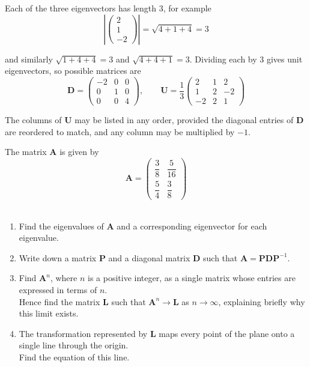 \documentclass[leqno]{article}
\begin{document}
\begin{enumerate}[
  label=\textbf{\arabic*.},
  leftmargin=*,
  topsep=0pt,
  partopsep=0pt,
  parsep=0pt
]
\begin{djsSolution}
\begin{enumerate}[label=\textbf{(\alph*)}, start=1]
Each of the three eigenvectors has length 3, for example
\[
\left|\begin{pmatrix}2\\1\\-2\end{pmatrix}\right|=\sqrt{4+1+4}=3
\]

and similarly \(\sqrt{1+4+4}=3\) and \(\sqrt{4+4+1}=3\). Dividing each by 3 gives unit eigenvectors, so possible matrices are
\[
\mathbf{D}=\begin{pmatrix} -2 & 0 & 0 \\ 0 & 1 & 0 \\ 0 & 0 & 4 \end{pmatrix},\qquad
\mathbf{U}=\dfrac{1}{3}\begin{pmatrix} 2 & 1 & 2 \\ 1 & 2 & -2 \\ -2 & 2 & 1 \end{pmatrix}
\]

The columns of \(\mathbf{U}\) may be listed in any order, provided the diagonal entries of \(\mathbf{D}\) are reordered to match, and any column may be multiplied by \(-1\).
\end{enumerate}
\end{djsSolution}

\newpage

\questionitem

The matrix $\mathbf{A}$ is given by
\[\mathbf{A} = \begin{pmatrix} \dfrac{3}{8} & \dfrac{5}{16} \\[6pt] \dfrac{5}{4} & \dfrac{3}{8} \end{pmatrix}\] \\
\begin{enumerate}[label=\textbf{(\alph*)}]
  \item Find the eigenvalues of $\mathbf{A}$ and a corresponding eigenvector for each eigenvalue.  \\
  \item Write down a matrix $\mathbf{P}$ and a diagonal matrix $\mathbf{D}$ such that $\mathbf{A} = \mathbf{P}\mathbf{D}\mathbf{P}^{-1}$.  \\
  \item Find $\mathbf{A}^n$, where $n$ is a positive integer, as a single matrix whose entries are expressed in terms of $n$. \\
  Hence find the matrix $\mathbf{L}$ such that $\mathbf{A}^n \to \mathbf{L}$ as $n \to \infty$, explaining briefly why this limit exists.  \\
  \item The transformation represented by $\mathbf{L}$ maps every point of the plane onto a single line through the origin. \\
  Find the equation of this line.  \\
\end{enumerate}


\end{enumerate}
\end{document}
